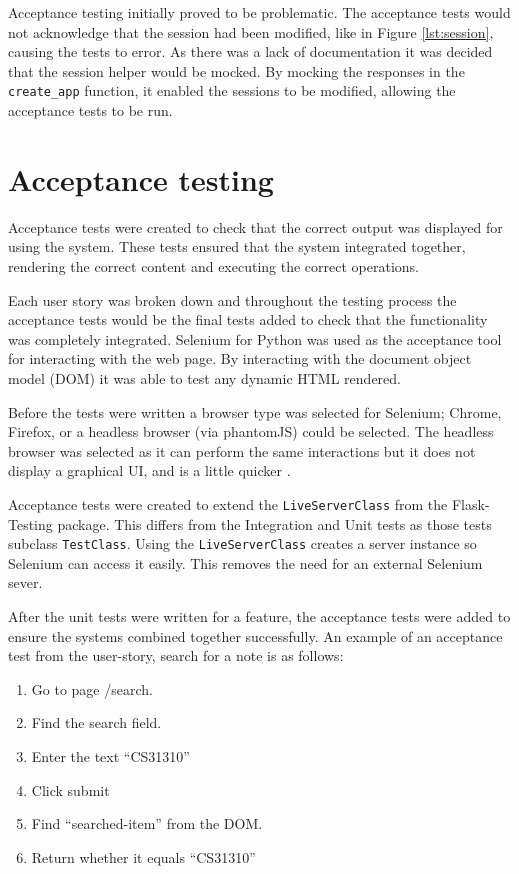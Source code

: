 Acceptance testing initially proved to be problematic. The acceptance tests would not acknowledge that the session had been modified, like in Figure \ref{lst:session}, causing the tests to error. As there was a lack of documentation it was decided that the session helper would be mocked. By mocking the responses in the \texttt{create\_app} function, it enabled the sessions to be modified, allowing the acceptance tests to be run.
\section{Acceptance testing}
Acceptance tests were created to check that the correct output was displayed for using the system. These tests ensured that the system integrated together, rendering the correct content and executing the correct operations.

Each user story was broken down and throughout the testing process the acceptance tests would be the final tests added to check that the functionality was completely integrated. Selenium for Python \cite{citeulike:14020625} was used as the acceptance tool for interacting with the web page. By interacting with the document object model (DOM) it was able to test any dynamic HTML rendered.

Before the tests were written a browser type was selected for Selenium; Chrome, Firefox, or a headless browser (via phantomJS) could be selected. The headless browser was selected as it can perform the same interactions but it does not display a graphical UI, and is a little quicker \cite{citeulike:13983611}.

Acceptance tests were created to extend the \texttt{LiveServerClass} from the Flask-Testing package. This differs from the Integration and Unit tests as those tests subclass \texttt{TestClass}. Using the \texttt{LiveServerClass} creates a server instance so Selenium can access it easily. This removes the need for an external Selenium sever.

After the unit tests were written for a feature, the acceptance tests were added to ensure the systems combined together successfully. An example of an acceptance test from the user-story, search for a note is as follows:
\begin{enumerate}
  \item Go to page /search.
  \item Find the search field.
  \item Enter the text ``CS31310''
  \item Click submit
  \item Find ``searched-item'' from the DOM.
  \item Return whether it equals ``CS31310''
\end{enumerate}

